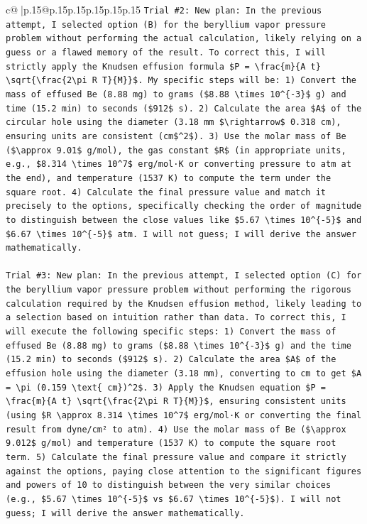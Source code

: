 \documentclass{article}
\begin{document}
{\begin{supertabular}{c@{$\;$}|p{.15\linewidth}@{}p{.15\linewidth}p{.15\linewidth}p{.15\linewidth}p{.15\linewidth}p{.15\linewidth}}
{{{\texttt{Trial \#2: New plan: In the previous attempt, I selected option (B) for the beryllium vapor pressure problem without performing the actual calculation, likely relying on a guess or a flawed memory of the result. To correct this, I will strictly apply the Knudsen effusion formula \$P = \textbackslash{}frac\{m\}\{A t\} \textbackslash{}sqrt\{\textbackslash{}frac\{2\textbackslash{}pi R T\}\{M\}\}\$. My specific steps will be: 1) Convert the mass of effused Be (8.88 mg) to grams (\$8.88 \textbackslash{}times 10\^{}\{{-}3\}\$ g) and time (15.2 min) to seconds (\$912\$ s). 2) Calculate the area \$A\$ of the circular hole using the diameter (3.18 mm \$\textbackslash{}rightarrow\$ 0.318 cm), ensuring units are consistent (cm\$\^{}2\$). 3) Use the molar mass of Be (\$\textbackslash{}approx 9.01\$ g/mol), the gas constant \$R\$ (in appropriate units, e.g., \$8.314 \textbackslash{}times 10\^{}7\$ erg/mol·K or converting pressure to atm at the end), and temperature (1537 K) to compute the term under the square root. 4) Calculate the final pressure value and match it precisely to the options, specifically checking the order of magnitude to distinguish between the close values like \$5.67 \textbackslash{}times 10\^{}\{{-}5\}\$ and \$6.67 \textbackslash{}times 10\^{}\{{-}5\}\$ atm. I will not guess; I will derive the answer mathematically.} \\
\\ 
\texttt{Trial \#3: New plan: In the previous attempt, I selected option (C) for the beryllium vapor pressure problem without performing the rigorous calculation required by the Knudsen effusion method, likely leading to a selection based on intuition rather than data. To correct this, I will execute the following specific steps: 1) Convert the mass of effused Be (8.88 mg) to grams (\$8.88 \textbackslash{}times 10\^{}\{{-}3\}\$ g) and the time (15.2 min) to seconds (\$912\$ s). 2) Calculate the area \$A\$ of the effusion hole using the diameter (3.18 mm), converting to cm to get \$A = \textbackslash{}pi (0.159 \textbackslash{}text\{ cm\})\^{}2\$. 3) Apply the Knudsen equation \$P = \textbackslash{}frac\{m\}\{A t\} \textbackslash{}sqrt\{\textbackslash{}frac\{2\textbackslash{}pi R T\}\{M\}\}\$, ensuring consistent units (using \$R \textbackslash{}approx 8.314 \textbackslash{}times 10\^{}7\$ erg/mol·K or converting the final result from dyne/cm² to atm). 4) Use the molar mass of Be (\$\textbackslash{}approx 9.012\$ g/mol) and temperature (1537 K) to compute the square root term. 5) Calculate the final pressure value and compare it strictly against the options, paying close attention to the significant figures and powers of 10 to distinguish between the very similar choices (e.g., \$5.67 \textbackslash{}times 10\^{}\{{-}5\}\$ vs \$6.67 \textbackslash{}times 10\^{}\{{-}5\}\$). I will not guess; I will derive the answer mathematically.} \\
}}}
\end{supertabular}}
\end{document}
